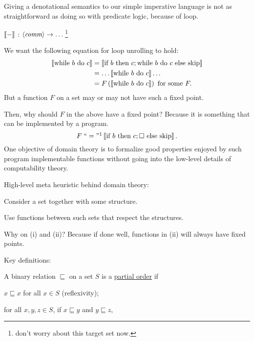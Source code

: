\begin{enumcirc}
	\item
	Giving a denotational semantics to our simple imperative language is not as
	straightforward as doing so with predicate logic, because of loop.
	\item
	$\bbrackets{-}$ : $\gram{comm} \to \dots$\;\footnote{don't worry about this target set now.}

	We want the following equation for loop unrolling to hold:
	\begin{align*}
		\bbrackets{\cwhile{b}{c}} & = \bbrackets{\cif{b}{c ; \cwhile{b}{c}}{\cskip}}             \\
		                          & = \dots \bbrackets{\cwhile{b}{c}} \dots                      \\
		                          & = F \prths{\bbrackets{\cwhile{b}{c}}} \textrm{ for some } F.
	\end{align*}
	But a function $F$ on a set may or may not have such a fixed point.
	\item
	Then, why should $F$ in the above have a fixed point?
	Because it is something that can be implemented by a program.
	\[
		F \; ``=" \footnotemark \bbrackets{\cif{b}{c ; \Box}{\cskip}}.
	\]
	One objective of domain theory is to formalize good properties enjoyed by such
	program implementable functions without going into the low-level details of
	computability theory.
	\item
	High-level meta heuristic behind domain theory:
	\begin{enumrm}
		\item
		Consider a set together with some structure.
		\item
		Use functions between such sets that respect the structures.
		\item
		Why on (i) and (ii)?
		Because if done well, functions in (ii) will always have fixed points.
	\end{enumrm}
	\item
	Key definitions:
	\begin{definition}[partial order]
		A binary relation $\sqsubseteq$ on a set $S$ is a \ul{partial order} if
		\begin{enumrm}
			\item
			$x \sqsubseteq x$ for all $x \in S$ (reflexivity);
			\item
			for all $x, y, z \in S$, if $x \sqsubseteq y$ and $y \sqsubseteq z$,

\end{enumrm}
\end{definition}
\end{enumcirc}
